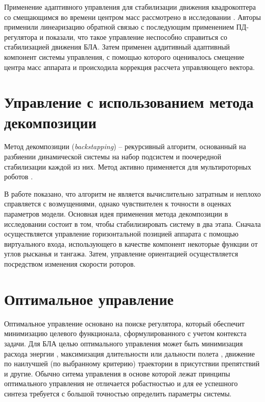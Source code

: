 Применение адаптивного управления для стабилизации движения квадрокоптера со смещающимся во времени центром масс рассмотрено в исследовании \cite{Palunko01}. Авторы применили линеаризацию обратной связью с последующим применением ПД-регулятора и показали, что такое управление неспособно справиться со стабилизацией движения БЛА. Затем применен аддитивный адаптивный компонент системы управления, с помощью которого оценивалось смещение центра масс аппарата и происходила коррекция рассчета управляющего вектора.

\section{Управление с использованием метода декомпозиции}

Метод декомпозиции (\textit{backstapping}) -- рекурсивный алгоритм, основанный на разбиении динамической системы на набор подсистем и поочередной стабилизации каждой из них. Метод активно применяется для мультироторных роботов \cite{Pota01, Chen01, Jung01, Huo01}.

В работе \cite{Madani01} показано, что алгоритм не является вычислительно затратным и неплохо справляется с возмущениями, однако чувствителен к точности в оценках параметров модели. Основная идея применения метода декомпозиции в исследовании состоит в том, чтобы стабилизировать систему в два этапа. Сначала осуществляется управление горизонтальной позицией аппарата с помощью виртуального входа, использующего в качестве компонент некоторые функции от углов рысканья и тангажа. Затем, управление ориентацией осуществляется посредством изменения скорости роторов.

\section{Оптимальное управление}

Оптимальное управление основано на поиске регулятора, который обеспечит минимизацию целевого функционала, сформулированного с учетом контекста задачи.
Для БЛА целью оптимального управления может быть минимизация расхода энергии \cite{Morbidi01, Huang01}, максимизация длительности или дальности полета \cite{Cowling01, Suicmez01}, движение по наилучшей (по выбранному критерию) траектории в присутствии препятствий \cite{Chen02, Cheng01} и другие.
Обычно ситема управления в основе которой лежат принципы оптимального управления не отличается робастностью и для ее успешного синтеза требуется с большой точностью определить параметры системы.

